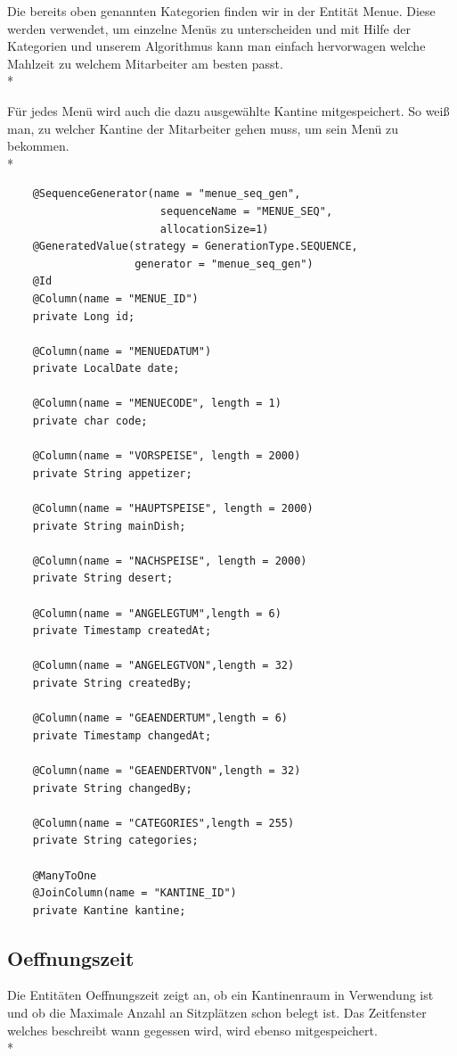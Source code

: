 Die bereits oben genannten Kategorien finden wir in der Entität Menue. 
Diese werden verwendet, um einzelne Menüs zu unterscheiden und mit Hilfe der Kategorien und unserem Algorithmus kann man einfach hervorwagen welche Mahlzeit zu welchem Mitarbeiter am besten passt. \\*

Für jedes Menü wird auch die dazu ausgewählte Kantine mitgespeichert. So weiß man, zu welcher Kantine der Mitarbeiter gehen muss, um sein Menü zu bekommen. \\*

\begin{lstlisting}
    @SequenceGenerator(name = "menue_seq_gen", 
                        sequenceName = "MENUE_SEQ",
                        allocationSize=1)
    @GeneratedValue(strategy = GenerationType.SEQUENCE, 
                    generator = "menue_seq_gen")
    @Id
    @Column(name = "MENUE_ID")
    private Long id;

    @Column(name = "MENUEDATUM")
    private LocalDate date;

    @Column(name = "MENUECODE", length = 1)
    private char code;

    @Column(name = "VORSPEISE", length = 2000)
    private String appetizer;

    @Column(name = "HAUPTSPEISE", length = 2000)
    private String mainDish;

    @Column(name = "NACHSPEISE", length = 2000)
    private String desert;

    @Column(name = "ANGELEGTUM",length = 6)
    private Timestamp createdAt;

    @Column(name = "ANGELEGTVON",length = 32)
    private String createdBy;

    @Column(name = "GEAENDERTUM",length = 6)
    private Timestamp changedAt;

    @Column(name = "GEAENDERTVON",length = 32)
    private String changedBy;

    @Column(name = "CATEGORIES",length = 255)
    private String categories;

    @ManyToOne
    @JoinColumn(name = "KANTINE_ID")
    private Kantine kantine;
\end{lstlisting}

\subsection{Oeffnungszeit}

Die Entitäten Oeffnungszeit zeigt an, ob ein Kantinenraum in Verwendung ist und ob die Maximale Anzahl an Sitzplätzen schon belegt ist. Das Zeitfenster welches beschreibt wann gegessen wird, wird ebenso mitgespeichert. \\*

